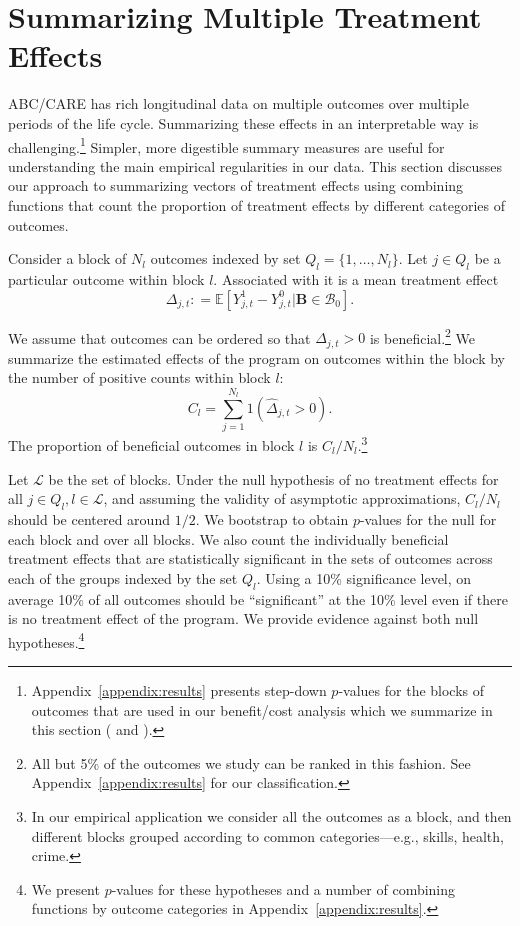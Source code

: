 \section{Summarizing Multiple Treatment Effects} \label{section:methodology}

ABC/CARE has rich longitudinal data on multiple outcomes over multiple periods of the life cycle. Summarizing these effects in an interpretable way is challenging.\footnote{Appendix~\ref{appendix:results} presents step-down $p$-values for the blocks of outcomes that are used in our benefit/cost analysis which we summarize in this section (\citealp{Lehman_Romano_2005_AnnStat} and \citealp{Romano_Shaikh_2006_AnnStat}).} Simpler, more digestible summary measures are useful for understanding the main empirical regularities in our data. This section discusses our approach to summarizing vectors of treatment effects using combining functions that count the proportion of treatment effects by different categories of outcomes.

Consider a block of $N_l$ outcomes indexed by set $Q_l = \{1,\dots,N_l\}$. Let $j \in Q_l$ be a particular outcome within block $l$. Associated with it is a mean treatment effect
\begin{equation}
\Delta_{j,t} : = \mathbb{E} \left[ Y^1_{j,t} - Y^0_{j,t} | \bm{B} \in \mathcal{B}_0 \right].
\end{equation}

We assume that outcomes can be ordered so that $\Delta_{j,t} >0$ is beneficial.\footnote{All but 5\% of the outcomes we study can be ranked in this fashion. See Appendix~\ref{appendix:results} for our classification.} We summarize the estimated effects of the program on outcomes within the block by the number of positive counts within block $l$:
\begin{equation}
C_l = \sum^{N_l}_{j=1} 1 (\hat{\Delta}_{j,t} >0).
\end{equation}
The proportion of beneficial outcomes in block $l$ is $C_l / N_l$.\footnote{In our empirical application we consider all the outcomes as a block, and then different blocks grouped according to common categories---e.g., skills, health, crime.}

Let $\mathcal{L}$ be the set of blocks. Under the null hypothesis of no treatment effects for all $j \in Q_l, l \in \mathcal{L}$, and assuming the validity of asymptotic approximations, $C_l / N_l$ should be centered around $1/2$. We bootstrap to obtain $p$-values for the null for each block and over all blocks. We also count the individually beneficial treatment effects that are statistically significant in the sets of outcomes across each of the groups indexed by the set $Q_l$. Using a 10\% significance level, on average 10\% of all outcomes should be ``significant'' at the 10\% level even if there is no treatment effect of the program. We provide evidence against both null hypotheses.\footnote{We present $p$-values for these hypotheses and a number of combining functions by outcome categories in Appendix~\ref{appendix:results}.}

